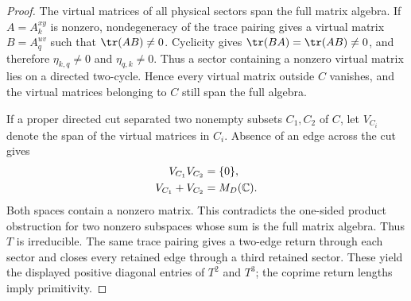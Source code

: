 \begin{proof}\leanok
    The virtual matrices of all physical sectors span the full matrix
    algebra. If $A=A_k^{xy}$ is nonzero, nondegeneracy of the trace pairing
    gives a virtual matrix $B=A_q^{uv}$ such that $\tr(AB)\ne0$.
    Cyclicity gives $\tr(BA)=\tr(AB)\ne0$, and therefore
    $\eta_{k,q}\ne0$ and $\eta_{q,k}\ne0$.
    Thus a sector containing a nonzero virtual matrix lies on a directed
    two-cycle. Hence every virtual matrix outside $C$ vanishes, and the
    virtual matrices belonging to $C$ still span the full algebra.

    If a proper directed cut separated two nonempty subsets $C_1,C_2$ of
    $C$, let $V_{C_i}$ denote the span of the virtual matrices in $C_i$.
    Absence of an edge across the cut gives
    \begin{align}
        V_{C_1}V_{C_2}  & =\{0\},
        \notag                             \\
        V_{C_1}+V_{C_2} & =M_D(\mathbb C).
        \notag
    \end{align}
    Both spaces contain a nonzero matrix. This contradicts the one-sided
    product obstruction for two nonzero subspaces whose sum is the full
    matrix algebra. Thus $T$ is irreducible. The same trace pairing gives a
    two-edge return through each sector and closes every retained edge
    through a third retained sector. These yield the displayed positive
    diagonal entries of $T^2$ and $T^3$; the coprime return lengths imply
    primitivity.
\end{proof}

